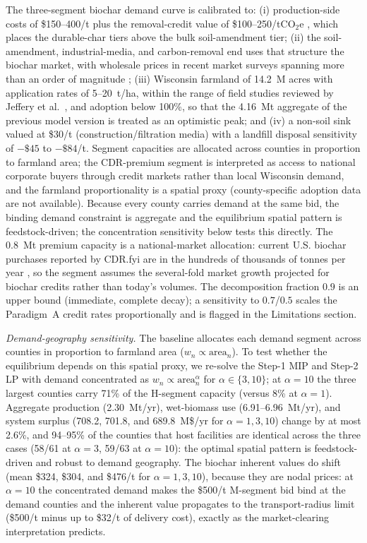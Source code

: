 The three-segment biochar demand curve is calibrated to: (i) production-side
costs of \$150--400/t \cite{roberts2010,shabangu2014} plus the removal-credit
value of \$100--250/tCO$_2$e \cite{cdrfyi2024,verraVM0044}, which places the
durable-char tiers above the bulk soil-amendment tier; (ii) the
soil-amendment, industrial-media, and carbon-removal end uses that structure
the biochar market, with wholesale prices in
recent market surveys spanning more than an order of magnitude
\cite{ibi2025}; (iii)
Wisconsin farmland of 14.2~M acres
with application rates of 5--20~t/ha, within the range of field studies
reviewed by Jeffery et al.~\cite{jeffery2011}, and adoption below 100\%, so
that the
4.16~Mt aggregate of the previous model version is treated as an optimistic
peak; and (iv) a non-soil sink valued at \$30/t (construction/filtration media)
with a landfill disposal sensitivity of $-\$45$ to $-\$84$/t. Segment
capacities are allocated across counties in proportion to farmland area; the
CDR-premium segment is interpreted as access to national corporate buyers
through credit markets rather than local Wisconsin demand, and the farmland
proportionality is a spatial proxy (county-specific adoption data are not
available). Because every county carries demand at the same bid, the binding
demand constraint is aggregate and the equilibrium spatial pattern is
feedstock-driven; the concentration sensitivity below tests this directly.
The 0.8~Mt premium capacity is a national-market allocation:
current U.S. biochar purchases reported by CDR.fyi are in the hundreds of
thousands of tonnes per year \cite{cdrfyi2024}, so the segment assumes the
several-fold market growth projected for biochar credits rather than today's
volumes. The decomposition fraction $0.9$ is an upper bound (immediate,
complete decay); a sensitivity to $0.7$/$0.5$ scales the Paradigm~A credit
rates proportionally and is flagged in the Limitations section.

\emph{Demand-geography sensitivity.} The baseline allocates each demand
segment across counties in proportion to farmland area ($w_n \propto
\mathrm{area}_n$). To test whether the equilibrium depends on this spatial
proxy, we re-solve the Step-1 MIP and Step-2 LP with demand concentrated as
$w_n \propto \mathrm{area}_n^{\alpha}$ for $\alpha \in \{3, 10\}$; at
$\alpha=10$ the three largest counties carry 71\% of the H-segment capacity
(versus 8\% at $\alpha=1$). Aggregate production (2.30~Mt/yr), wet-biomass
use (6.91--6.96~Mt/yr), and system surplus (708.2, 701.8, and
689.8~M\$/yr for $\alpha=1,3,10$) change by at most 2.6\%, and 94--95\% of the
counties that host facilities are identical across the three cases (58/61 at
$\alpha=3$, 59/63 at $\alpha=10$): the optimal spatial pattern is
feedstock-driven and robust to demand geography. The biochar inherent values
do shift (mean \$324, \$304, and \$476/t for $\alpha=1,3,10$), because they
are nodal prices: at $\alpha=10$ the concentrated demand makes the \$500/t
M-segment bid bind at the demand counties and the inherent value propagates to
the transport-radius limit (\$500/t minus up to \$32/t of delivery cost),
exactly as the market-clearing interpretation predicts.

